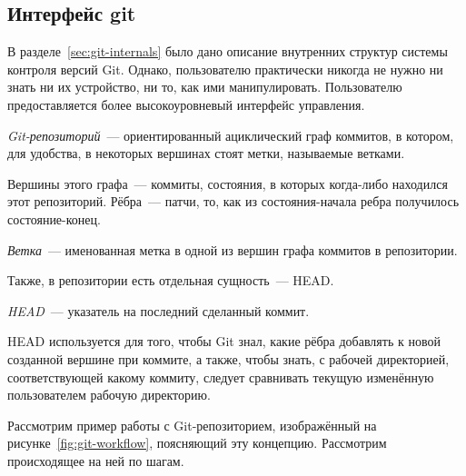 \subsection{Интерфейс git}

В разделе~\ref{sec:git-internals} было дано описание внутренних
структур системы контроля версий Git. Однако, пользователю практически
никогда не нужно ни знать ни их устройство, ни то, как ими
манипулировать. Пользователю предоставляется более высокоуровневый
интерфейс управления. 

%

\begin{definition}
  \emph{Git-репозиторий}~--- ориентированный ациклический граф
  коммитов, в котором, для удобства, в некоторых вершинах стоят метки,
  называемые ветками.
  
  Вершины этого графа~--- коммиты, состояния, в которых когда-либо
  находился этот репозиторий. Рёбра~--- патчи, то, как из
  состояния-начала ребра получилось состояние-конец.
\end{definition}

\begin{definition}[Ветка]
  \emph{Ветка}~--- именованная метка в одной из вершин графа коммитов
  в репозитории.
\end{definition}

Также, в репозитории есть отдельная сущность~--- HEAD. 

\begin{definition}[HEAD]
  \emph{HEAD}~--- указатель на последний сделанный коммит.
\end{definition}

HEAD используется для того, чтобы Git знал, какие рёбра добавлять к
новой созданной вершине при коммите, а также, чтобы знать, с рабочей
директорией, соответствующей какому коммиту, следует сравнивать
текущую изменённую пользователем рабочую директорию.

Рассмотрим пример работы с Git-репозиторием, изображённый на
рисунке~\ref{fig:git-workflow}, поясняющий эту концепцию. Рассмотрим
происходящее на ней по шагам.

